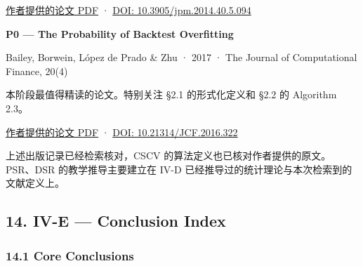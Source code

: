 \href{https://www.davidhbailey.com/dhbpapers/deflated-sharpe.pdf}{作者提供的论文 PDF} · \href{https://doi.org/10.3905/jpm.2014.40.5.094}{DOI: 10.3905/jpm.2014.40.5.094}

\textbf{P0 --- The Probability of Backtest Overfitting}

Bailey, Borwein, López de Prado \& Zhu · 2017 · The Journal of Computational Finance, 20(4)

本阶段最值得精读的论文。特别关注 §2.1 的形式化定义和 §2.2 的 Algorithm 2.3。

\href{https://www.davidhbailey.com/dhbpapers/backtest-prob.pdf}{作者提供的论文 PDF} · \href{https://doi.org/10.21314/JCF.2016.322}{DOI: 10.21314/JCF.2016.322}

上述出版记录已经检索核对，CSCV 的算法定义也已核对作者提供的原文。PSR、DSR 的教学推导主要建立在 IV-D 已经推导过的统计理论与本次检索到的文献定义上。

\hypertarget{part-4-71-0001-iv-e-conclusion-index}{%
\subsection{14. IV-E --- Conclusion Index}\label{part-4-71-0001-iv-e-conclusion-index}}

\hypertarget{part-4-71-0001-core-conclusions}{%
\subsubsection{14.1 Core Conclusions}\label{part-4-71-0001-core-conclusions}}

